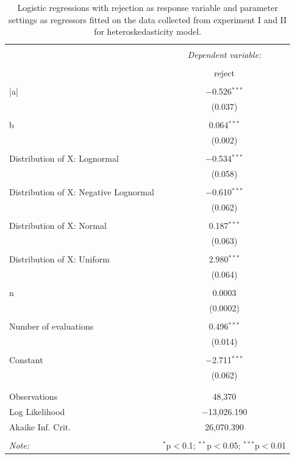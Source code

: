\documentclass{monashthesis}
\theoremstyle{definition}
\theoremstyle{definition}
\theoremstyle{definition}
\theoremstyle{definition}
\theoremstyle{remark}
\begin{document}
\begin{table}[!htbp] \centering 
  \caption{Logistic regressions with rejection as response variable and parameter settings as regressors fitted on the data collected from experiment I and II for heteroskedasticity model.} 
  \label{tab:rejectfactorheter} 
\begin{tabular}{@{\extracolsep{5pt}}lc} 
\\[-1.8ex]\hline 
\hline \\[-1.8ex] 
 & \multicolumn{1}{c}{\textit{Dependent variable:}} \\ 
\cline{2-2} 
\\[-1.8ex] & reject \\ 
\hline \\[-1.8ex] 
 |a| & $-$0.526$^{***}$ \\ 
  & (0.037) \\ 
  & \\ 
 b & 0.064$^{***}$ \\ 
  & (0.002) \\ 
  & \\ 
 Distribution of X: Lognormal & $-$0.534$^{***}$ \\ 
  & (0.058) \\ 
  & \\ 
 Distribution of X: Negative Lognormal & $-$0.610$^{***}$ \\ 
  & (0.062) \\ 
  & \\ 
 Distribution of X: Normal & 0.187$^{***}$ \\ 
  & (0.063) \\ 
  & \\ 
 Distribution of X: Uniform & 2.980$^{***}$ \\ 
  & (0.064) \\ 
  & \\ 
 n & 0.0003 \\ 
  & (0.0002) \\ 
  & \\ 
 Number of evaluations & 0.496$^{***}$ \\ 
  & (0.014) \\ 
  & \\ 
 Constant & $-$2.711$^{***}$ \\ 
  & (0.062) \\ 
  & \\ 
\hline \\[-1.8ex] 
Observations & 48,370 \\ 
Log Likelihood & $-$13,026.190 \\ 
Akaike Inf. Crit. & 26,070.390 \\ 
\hline 
\hline \\[-1.8ex] 
\textit{Note:}  & \multicolumn{1}{r}{$^{*}$p$<$0.1; $^{**}$p$<$0.05; $^{***}$p$<$0.01} \\ 
\end{tabular} 
\end{table}
\end{document}
